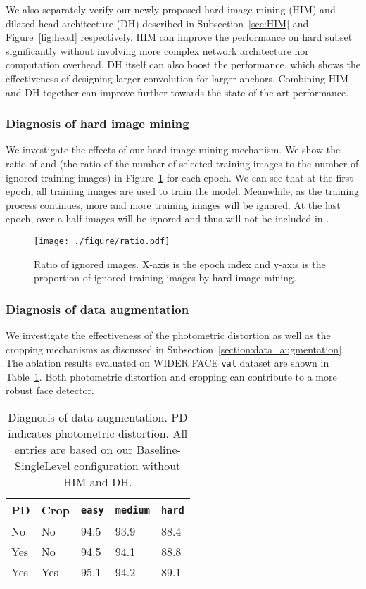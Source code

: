 \documentclass[10pt,twocolumn,letterpaper]{article}
\begin{document}
We also separately verify our newly proposed hard image mining (HIM) and dilated head architecture (DH) described in Subsection~\ref{sec:HIM} and Figure~\ref{fig:head}
respectively.
HIM can improve the performance on hard subset significantly without involving more complex network
architecture nor computation overhead. DH itself can also boost the performance, which
shows the effectiveness of designing larger convolution for larger anchors.
Combining HIM and DH together can improve further towards the state-of-the-art performance.
\subsubsection*{Diagnosis of hard image mining}
We investigate the effects of our hard image mining mechanism. We show the ratio of  and  (\ie the ratio of the number of selected training images to
the number of ignored training images) in Figure~\ref{fig:ratio} for each
epoch. We can see that at the
first epoch, all training images are used to train the model. Meanwhile, as the training process continues, more and more training images will be ignored. At the last epoch, over a half images will be ignored and thus will not be included in .
\begin{figure}[!tb]
\texttt{[image: ./figure/ratio.pdf]}
\caption{Ratio of ignored images. X-axis is the epoch index and y-axis is the proportion
of ignored training images by hard image mining.}
\label{fig:ratio}
\end{figure}

\subsubsection*{Diagnosis of data augmentation}
We investigate the effectiveness of the photometric distortion
as well as the cropping mechanisms as discussed in
Subsection~\ref{section:data_augmentation}. The ablation results evaluated on WIDER
FACE \texttt{val} dataset are shown in
Table~\ref{tbl:da}. Both photometric distortion and cropping can contribute to a more
robust face detector.
\begin{table}[ht]
\centering
\begin{tabular}{|l|l|l|l|l|}
\hline
PD & Crop & \texttt{easy} & \texttt{medium} & \texttt{hard} \\ \hline
No  & No    & 94.5 & 93.9   & 88.4 \\ \hline
Yes  & No    & 94.5 & 94.1   & 88.8 \\ \hline
Yes  & Yes    & 95.1 & 94.2   & 89.1 \\ \hline
\end{tabular}
\caption{Diagnosis of data augmentation. PD indicates photometric distortion.
All entries are based on our Baseline-SingleLevel configuration without
HIM and DH.}\label{tbl:da}
\end{table}
\end{document}
